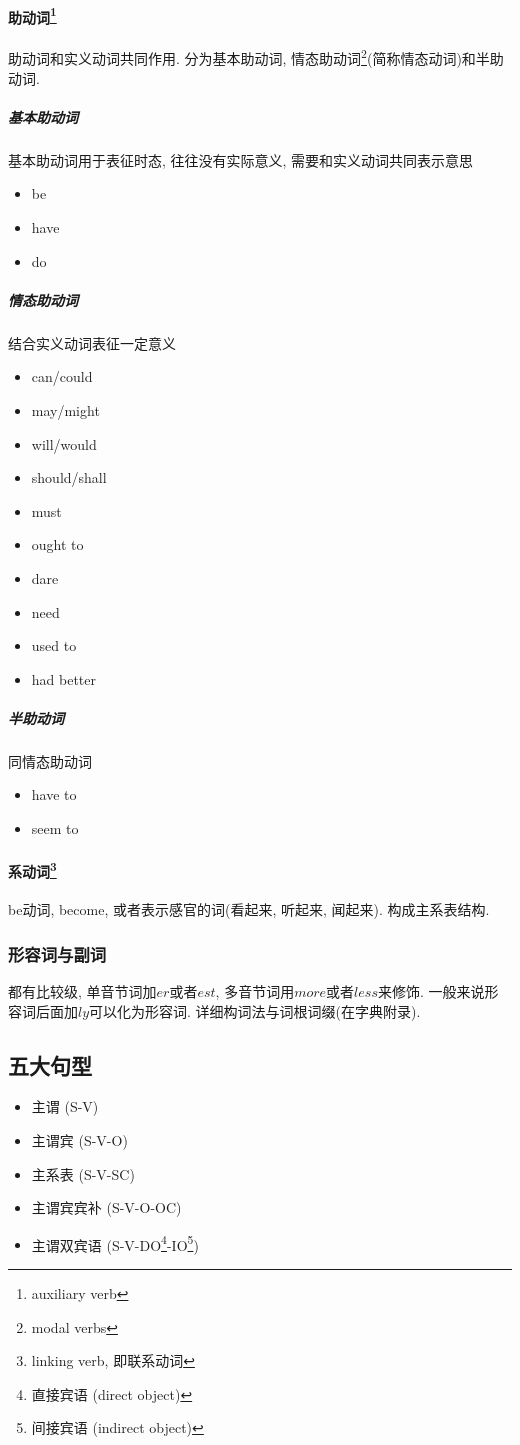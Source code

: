 \documentclass[a4paper]{article}
\begin{document}
\paragraph{助动词\protect\footnote{auxiliary verb}} 助动词和实义动词共同作用. 分为基本助动词, 情态助动词\footnote{modal verbs}(简称情态动词)和半助动词. 
\subparagraph{基本助动词}
基本助动词用于表征时态, 往往没有实际意义, 需要和实义动词共同表示意思
\begin{itemize}
  \item be
  \item have
  \item do
\end{itemize}
\subparagraph{情态助动词} 结合实义动词表征一定意义
\begin{itemize}
  \item can/could
  \item may/might
  \item will/would
  \item should/shall
  \item must
  \item ought to
  \item dare
  \item need
  \item used to 
  \item had better
\end{itemize}
\subparagraph{半助动词} 同情态助动词
\begin{itemize}
  \item have to 
  \item seem to
\end{itemize}
\paragraph{系动词\protect\footnote{linking verb, 即联系动词}}
be动词, become, 或者表示感官的词(看起来, 听起来, 闻起来). 构成主系表结构. 
\subsubsection{形容词与副词}
都有比较级, 单音节词加$er$或者$est$, 多音节词用$more$或者$less$来修饰. 
一般来说形容词后面加$ly$可以化为形容词. 详细构词法与词根词缀(在字典附录). 
\subsection{五大句型}
\begin{itemize}
  \item 主谓 (S-V)
  \item 主谓宾 (S-V-O)
  \item 主系表 (S-V-SC)
  \item 主谓宾宾补 (S-V-O-OC)
  \item 主谓双宾语 (S-V-DO\footnote{直接宾语 (direct object)}-IO\footnote{间接宾语 (indirect object)})
\end{itemize}
\end{document}
